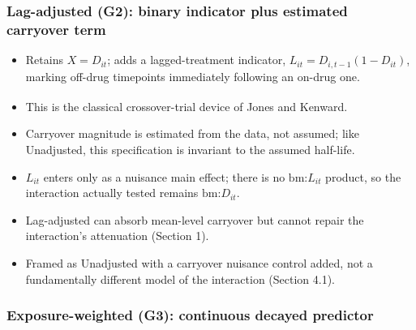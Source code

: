\documentclass[
  11pt,
]{article}
\providecommand{\tightlist}{%
  \setlength{\itemsep}{0pt}\setlength{\parskip}{0pt}}
\begin{document}
\subsubsection{Lag-adjusted (G2): binary indicator plus estimated carryover term}\label{lag-adjusted-g2-binary-indicator-plus-estimated-carryover-term}

\begin{itemize}
\tightlist
\item
  Retains \(X = D_{it}\); adds a lagged-treatment indicator,
  \(L_{it} = D_{i,t-1}(1 - D_{it})\), marking off-drug timepoints
  immediately following an on-drug one.
\item
  This is the classical crossover-trial device of Jones and Kenward\textsuperscript{}.
\item
  Carryover magnitude is estimated from the data, not assumed; like
  Unadjusted, this specification is invariant to the assumed
  half-life.
\item
  \(L_{it}\) enters only as a nuisance main effect; there is no
  \(\text{bm:}L_{it}\) product, so the interaction actually tested
  remains \(\text{bm:}D_{it}\).
\item
  Lag-adjusted can absorb mean-level carryover but cannot repair the
  interaction's attenuation (Section 1).
\item
  Framed as Unadjusted with a carryover nuisance control added, not a
  fundamentally different model of the interaction (Section 4.1).
\end{itemize}

\subsubsection{Exposure-weighted (G3): continuous decayed predictor}\label{exposure-weighted-g3-continuous-decayed-predictor}
\end{document}
